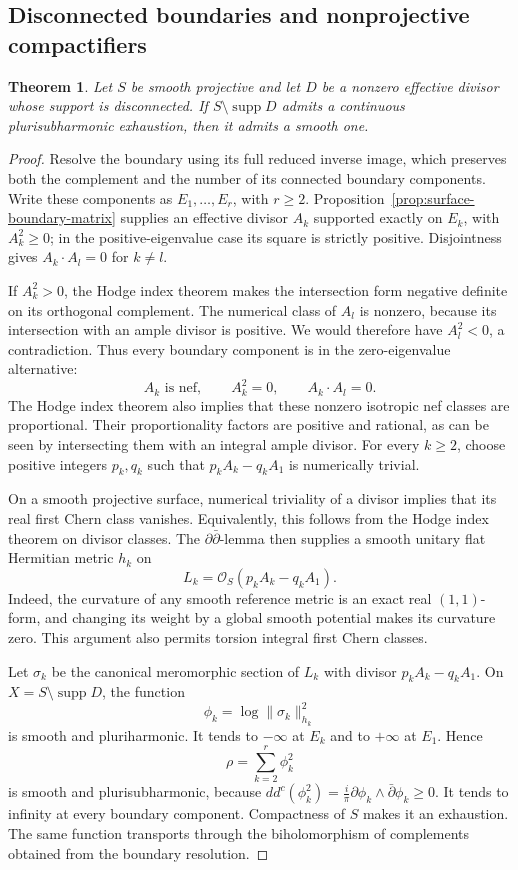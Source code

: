 \documentclass[11pt]{amsart}
\newtheorem{theorem}{Theorem}[section]
\theoremstyle{definition}
\theoremstyle{remark}
\numberwithin{equation}{section}
\newcommand{\OO}{\mathcal O}
\newcommand{\ddc}{dd^c}
\newcommand{\barp}{\bar\partial}
\newcommand{\supp}{\operatorname{supp}}
\begin{document}
\subsection{Disconnected boundaries and nonprojective compactifiers}\label{sec:surface-nonprojective}

\begin{theorem}\label{thm:surface-disconnected-boundary}
Let $S$ be smooth projective and let $D$ be a nonzero effective divisor
whose support is disconnected.  If $S\setminus\supp D$ admits a
continuous plurisubharmonic exhaustion, then it admits a smooth one.
\end{theorem}
\begin{proof}
Resolve the boundary using its full reduced inverse image, which
preserves both the complement and the number of its connected boundary
components.  Write these components as $E_1,\ldots,E_r$, with $r\ge2$.
Proposition~\ref{prop:surface-boundary-matrix} supplies an effective
divisor $A_k$ supported exactly on $E_k$, with $A_k^2\ge0$; in the
positive-eigenvalue case its square is strictly positive.  Disjointness
gives $A_k\cdot A_l=0$ for $k\ne l$.

If $A_k^2>0$, the Hodge index theorem makes the intersection form
negative definite on its orthogonal complement.  The numerical class
of $A_l$ is nonzero, because its intersection with an ample divisor is
positive.  We would therefore have $A_l^2<0$, a contradiction.  Thus
every boundary component is in the zero-eigenvalue alternative:
\[
 A_k\text{ is nef},\qquad A_k^2=0,\qquad A_k\cdot A_l=0.
\]
The Hodge index theorem also implies that these nonzero isotropic nef
classes are proportional.  Their proportionality factors are positive
and rational, as can be seen by intersecting them with an integral
ample divisor.  For every $k\ge2$, choose positive integers $p_k,q_k$
such that $p_kA_k-q_kA_1$ is numerically trivial.

On a smooth projective surface, numerical triviality of a divisor
implies that its real first Chern class vanishes.  Equivalently, this
follows from the Hodge index theorem on divisor classes.  The
$\partial\bar\partial$-lemma then supplies a smooth unitary flat
Hermitian metric $h_k$ on
\[
 L_k=\OO_S(p_kA_k-q_kA_1).
\]
Indeed, the curvature of any smooth reference metric is an exact real
$(1,1)$-form, and changing its weight by a global smooth potential
makes its curvature zero.  This argument also permits torsion integral
first Chern classes.

Let $\sigma_k$ be the canonical meromorphic section of $L_k$ with
divisor $p_kA_k-q_kA_1$.  On $X=S\setminus\supp D$, the function
\[
 \phi_k=\log\|\sigma_k\|_{h_k}^2
\]
is smooth and pluriharmonic.  It tends to $-\infty$ at $E_k$ and to
$+\infty$ at $E_1$.  Hence
\[
 \rho=\sum_{k=2}^r\phi_k^2
\]
is smooth and plurisubharmonic, because
$\ddc(\phi_k^2)=\frac{i}{\pi}\partial\phi_k\wedge\barp\phi_k\ge0$.
It tends to infinity at every boundary component.  Compactness of $S$
makes it an exhaustion.  The same function transports through the
biholomorphism of complements obtained from the boundary resolution.
\end{proof}
\end{document}
